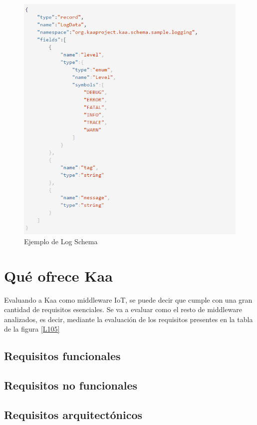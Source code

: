 \documentclass[12pt, twoside]{book}
\begin{document}
\begin{figure}[H]
\centering
\includegraphics[scale=0.5]{images/log_schema_example}
\caption{Ejemplo de Log Schema}\label{L504}
\end{figure} 
\section{Qué ofrece Kaa}
Evaluando a Kaa como middleware IoT, se puede decir que cumple con una gran cantidad de requisitos esenciales. Se va a evaluar como el resto de middleware analizados, es decir, mediante la evaluación de los requisitos presentes en la tabla de la figura \ref{L105} 
 
\subsection{Requisitos funcionales}

\subsection{Requisitos no funcionales}

\subsection{Requisitos arquitectónicos}
\end{document}
